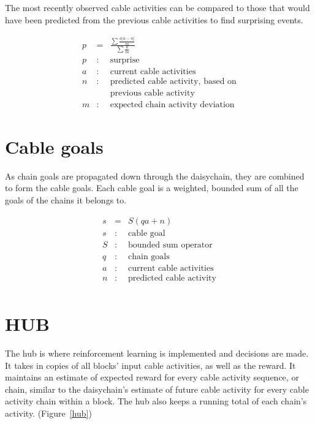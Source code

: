 \documentclass[oneside,twocolumn]{article}
\begin{document}
The most recently observed cable activities can be compared to those that would have been predicted from the previous cable activities to find surprising events.

\begin{eqnarray*}
p &= &  \frac{\sum \frac{a | a - n |}{m}}{\sum{\frac{a}{m}}} \\
p &:& \mbox{surprise} \\
a &:& \mbox{current cable activities} \\
n &:& \mbox{predicted cable activity, based on} \\
&& \mbox{previous cable activity} \\
m &:& \mbox{expected chain activity deviation} 
\end{eqnarray*}

\section*{\color{copper} Cable goals}

As chain goals are propagated down through the daisychain, they are combined to form the cable goals. Each cable goal is a weighted, bounded sum of all the goals of the chains it belongs to.

\begin{eqnarray*}
s &= &  S(qa + n) \\
s &:& \mbox{cable goal} \\
S &:& \mbox{bounded sum operator} \\
q &:& \mbox{chain goals} \\
a &:& \mbox{current cable activities} \\
n &:& \mbox{predicted cable activity} \\
\end{eqnarray*}

\section*{\color{copper} HUB}

The hub is where reinforcement learning is implemented and decisions are made. It takes in copies of all blocks' input cable activities, as well as the reward. It maintains an estimate of expected reward for every cable activity sequence, or chain, similar to the daisychain's estimate of future cable activity for every cable activity chain within a block. The hub also keeps a running total of each chain's activity. (Figure~\ref{hub})  
\end{document}
